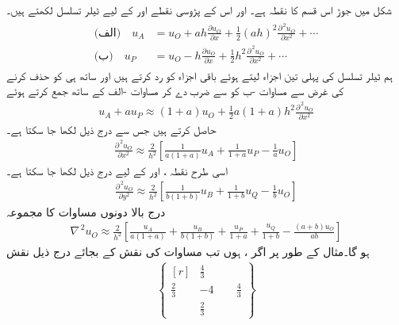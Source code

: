شکل  میں جوڑ  اس قسم کا نقطہ ہے۔  اور اس کے پڑوسی نقطے  اور  کے لیے ٹیلر تسلسل لکھتے ہیں۔
\begin{gather}
\begin{aligned}\label{مساوات_اعدادی_غیر_ہموار_سرحد_الف}
\text{(الف)}\quad u_A&=u_O+ah\frac{\partial u_O}{\partial x}+\frac{1}{2}(ah)^2\frac{\partial^{\,2}u_O}{\partial x^2}+\cdots\\
\text{(ب)}\quad u_P&=u_O-h\frac{\partial u_O}{\partial x}+\frac{1}{2}h^2\frac{\partial^{\,2}u_O}{\partial x^2}+\cdots
\end{aligned}
\end{gather}
ہم ٹیلر تسلسل کی پہلی تین اجزاء لیتے ہوئے باقی اجزاء  کو رد کرتے ہیں اور ساتھ ہی  کو حذف کرنے کی غرض سے مساوات -ب کو  سے ضرب دے کر مساوات -الف کے ساتھ جمع کرتے ہوئے
\begin{align*}
u_A+au_P\approx (1+a)u_O+\frac{1}{2}a(1+a)h^2\frac{\partial^{\,2}u_O}{\partial x^2}
\end{align*}
حاصل کرتے ہیں جس سے درج ذیل لکھا جا سکتا ہے۔
\begin{align*}
\frac{\partial^{\,2}u_O}{\partial x^2}\approx \frac{2}{h^2}\left[\frac{1}{a(1+a)}u_A+\frac{1}{1+a}u_P-\frac{1}{a}u_O\right]
\end{align*}
اسی طرح نقطہ ،  اور  کے لیے درج ذیل لکھا جا سکتا ہے۔
\begin{align*}
\frac{\partial^{\,2}u_O}{\partial y^2}\approx \frac{2}{h^2}\left[\frac{1}{b(1+b)}u_B+\frac{1}{1+b}u_Q-\frac{1}{b}u_O\right]
\end{align*}
درج بالا دونوں مساوات کا مجموعہ
\begin{align}\label{مساوات_اعدادی_نیبلا_الف}
\nabla^{\,2}u_O\approx \frac{2}{h^2}\left[\frac{u_A}{a(1+a)}+\frac{u_B}{b(1+b)}+\frac{u_P}{1+a}+\frac{u_Q}{1+b}-\frac{(a+b)u_O}{ab}\right]
\end{align}
ہو گا۔مثال کے طور پر اگر ،  ہوں تب مساوات  کی نقش کے بجائے درج ذیل نقش 
\begin{align*}
\left \{ 
\begin{matrix*}[r]
&\frac{4}{3}&\\
\frac{2}{3}&-4&\phantom{-}\frac{4}{3}\\
&\frac{2}{3}&
\end{matrix*}
\right\}
\end{align*}
